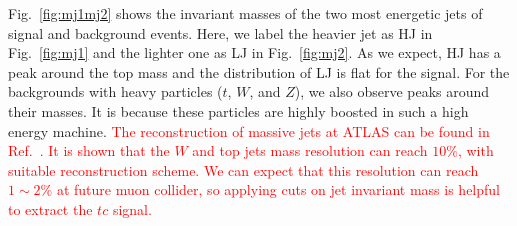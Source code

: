 \documentclass[a4paper,11pt]{article}
\begin{document}
Fig.~\ref{fig:mj1mj2} shows the invariant masses of the two most energetic jets of signal and background events. 
Here, we label the heavier jet as HJ in Fig.~\ref{fig:mj1} and the lighter one as LJ in Fig.~\ref{fig:mj2}.
As we expect, HJ has a peak around the top mass and the distribution of LJ is flat for the signal.
For the backgrounds with heavy particles ($t$, $W$, and $Z$), we also observe peaks around their masses. 
It is because these particles are highly boosted in such a high energy machine. 
\textcolor{red}{
The reconstruction of massive jets at ATLAS can be found in Ref.~\cite{ATLAS:2020gwe}.
It is shown that the $W$ and top jets mass resolution can reach $10\%$, 
with suitable reconstruction scheme. 
We can expect that this resolution can reach $1\sim 2\%$ at future muon collider, 
so applying cuts on jet invariant mass is helpful to extract the $tc$ signal.
}
\end{document}
